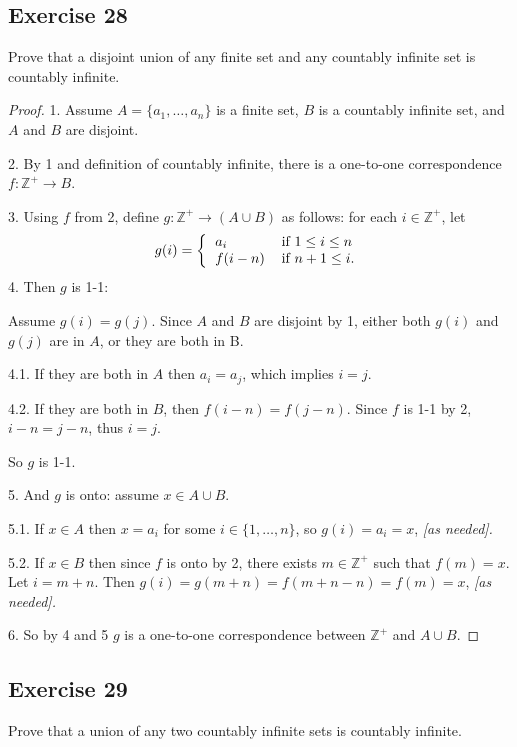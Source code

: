 \documentclass[14pt]{extarticle}
\newcommand{\Z}{\mathbb{Z}}
\begin{document}
\subsection{Exercise 28}
Prove that a disjoint union of any finite set and any countably infinite set is countably infinite.

\begin{proof}
1. Assume \(A = \{a_1, \ldots, a_n\}\) is a finite set, $B$ is a countably infinite set, and $A$ and $B$ are disjoint.

2. By 1 and definition of countably infinite, there is a one-to-one correspondence \(f: \Z^+ \to B\).

3. Using $f$ from 2, define \(g: \Z^+ \to (A \cup B)\) as follows: for each \(i \in \Z^+\), let
\[
g(i) =
\left\{
\begin{tabular}{ll}
\(a_i\) & if \(1 \leq i \leq n\) \\
\(f(i - n)\) & if \(n+1 \leq i\).
\end{tabular}
\right.
\]
4. Then $g$ is 1-1: 

Assume \(g(i) = g(j)\). Since $A$ and $B$ are disjoint by 1, either both $g(i)$ and $g(j)$ are in $A$, or they are 
both in B. 

4.1. If they are both in $A$ then \(a_i = a_j\), which implies $i = j$. 

4.2. If they are both in $B$, then \(f(i-n) = f(j-n)\). Since $f$ is 1-1 by 2, \(i-n = j-n\), thus \(i = j\). 

So $g$ is 1-1.

5. And $g$ is onto: assume \(x \in A \cup B\).

5.1. If \(x \in A\) then \(x = a_i\) for some \(i \in \{1, \ldots, n\}\), so \(g(i) = a_i = x\), {\it [as needed].}

5.2. If \(x \in B\) then since $f$ is onto by 2, there exists \(m \in \Z^+\) such that \(f(m)=x\). Let \(i =m+n\).
Then \(g(i) = g(m+n) = f(m+n-n) = f(m) = x\), {\it [as needed].}

6. So by 4 and 5 $g$ is a one-to-one correspondence between \(\Z^+\) and \(A \cup B\).
\end{proof}

\subsection{Exercise 29}
Prove that a union of any two countably infinite sets is countably infinite.
\end{document}
